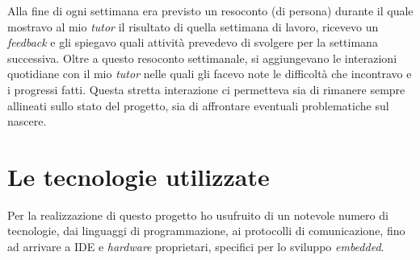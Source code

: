 \noindent
Alla fine di ogni settimana era previsto un resoconto (di persona) durante il quale mostravo al mio \textit{tutor} il risultato di quella settimana di lavoro, ricevevo un \textit{feedback} e gli spiegavo quali attività prevedevo di svolgere per la settimana successiva.
Oltre a questo resoconto settimanale, si aggiungevano le interazioni quotidiane con il mio \textit{tutor} nelle quali gli facevo note le difficoltà che incontravo e i progressi fatti.
Questa stretta interazione ci permetteva sia di rimanere sempre allineati sullo stato del progetto, sia di affrontare eventuali problematiche sul nascere.


\section{Le tecnologie utilizzate}
\noindent
Per la realizzazione di questo progetto ho usufruito di un notevole numero di tecnologie, dai linguaggi di programmazione, ai protocolli di comunicazione, fino ad arrivare a IDE e \textit{hardware}  proprietari, specifici per lo sviluppo \textit{embedded}.

